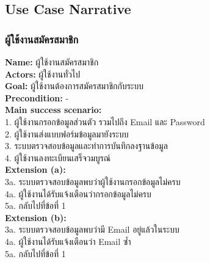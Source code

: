 \documentclass[12pt,oneside,openright,a4paper]{cpe-thai-project}
\begin{document}
\subsection{Use Case Narrative}

\subsubsection{ผู้ใช้งานสมัครสมาชิก}
\textbf{Name: }ผู้ใช้งานสมัครสมาชิก \\
\textbf{Actors: }ผู้ใช้งานทั่วไป \\
\textbf{Goal: }ผู้ใช้งานต้องการสมัครสมาชิกกับระบบ \\
\textbf{Precondition: }- \\
\textbf{Main success scenario: } \\
  \hspace*{0.5cm}1. ผู้ใช้งานกรอกข้อมูลส่วนตัว รวมไปถึง Email และ Password \\
  \hspace*{0.5cm}2. ผู้ใช้งานส่งแบบฟอร์มข้อมูลมายังระบบ \\
  \hspace*{0.5cm}3. ระบบตรวจสอบข้อมูลและทำการบันทึกลงฐานข้อมูล \\
  \hspace*{0.5cm}4. ผู้ใช้งานลงทะเบียนเสร็จวมบูรณ์ \\
\textbf{Extension (a): } \\
  \hspace*{0.5cm}3a. ระบบตรวจสอบข้อมูลพบว่าผู้ใช้งานกรอกข้อมูลไม่ครบ \\
  \hspace*{0.5cm}4a. ผู้ใช้งานได้รับแจ้งเตือนว่ากรอกข้อมูลไม่ครบ \\
  \hspace*{0.5cm}5a. กลับไปที่ข้อที่ 1 \\
\textbf{Extension (b): }  \\
  \hspace*{0.5cm}3a. ระบบตรวจสอบข้อมูลพบว่ามี Email อยู่แล้วในระบบ \\
  \hspace*{0.5cm}4a. ผู้ใช้งานได้รับแจ้งเตือนว่า Email ซ้ำ \\
  \hspace*{0.5cm}5a. กลับไปที่ข้อที่ 1 
\end{document}
